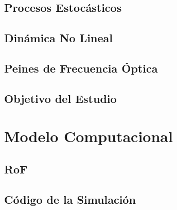 \documentclass[a4paper, 11pt, oneside]{book}
\begin{document}

				\section{Procesos Estocásticos}
					

				\section{Dinámica No Lineal}
					
%
				\section{Peines de Frecuencia Óptica}
					
					

				\section{Objetivo del Estudio}
					
				
			\chapter{Modelo Computacional}

				\section{RoF}
				

				\section{Código de la Simulación}
				
				
\end{document}
